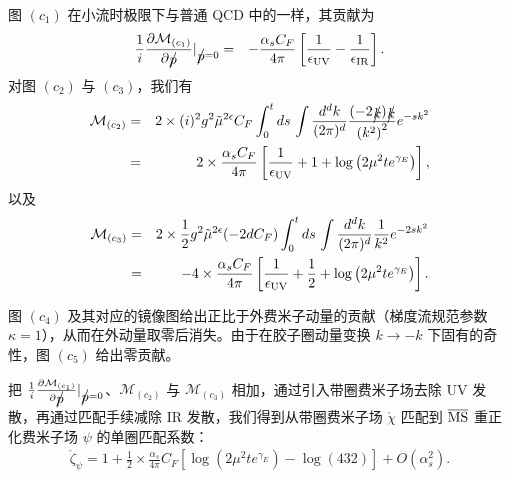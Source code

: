 图 $(c_1)$ 在小流时极限下与普通 QCD 中的一样，其贡献为
\begin{eqnarray}
\label{eq:c1}
\frac{1}{i}\frac{\partial\mathcal{M}_{(c_1)}}{\partial \slashed{p}}|_{\slashed{p}=0}&=& -\frac{\alpha_sC_F}{4\pi}\left[\frac{1}{\epsilon_{\rm UV}}-\frac{1}{\epsilon_{\rm IR}}\right].
\end{eqnarray}
对图 $(c_2)$ 与 $(c_3)$，我们有
\begin{eqnarray}
\label{eq:c2}
\mathcal{M}_{(c_2)}&=& 2\times (i)^2g^2\tilde{\mu}^{2\epsilon}C_F\int_0^tds\, \int\frac{d^dk}{(2\pi)^d}\frac{(-2\slashed{k})\slashed{k}}{\left(k^2 \right)^2}e^{-sk^2}\nonumber\\
&=&2\times\frac{\alpha_sC_F}{4\pi}\left[\frac{1}{\epsilon_{\rm UV}}+1+\log\left(2\mu^2 te^{\gamma_E}\right)\right],
\end{eqnarray}
以及
\begin{eqnarray}
\label{eq:c3}
\mathcal{M}_{(c_3)}&=&2\times \frac{1}{2}g^2\tilde{\mu}^{2\epsilon}(-2dC_F)\int_0^tds\, \int\frac{d^dk}{(2\pi)^d}\frac{1}{k^2}e^{-2sk^2}\nonumber\\
&=&-4\times\frac{\alpha_sC_F}{4\pi}\left[\frac{1}{\epsilon_{\rm UV}}+\frac{1}{2}+\log\left(2\mu^2 te^{\gamma_E}\right)\right].
\end{eqnarray}

图 $(c_4)$ 及其对应的镜像图给出正比于外费米子动量的贡献（梯度流规范参数 $\kappa=1$），从而在外动量取零后消失。由于在胶子圈动量变换 $k\rightarrow -k$ 下固有的奇性，图 $(c_5)$ 给出零贡献。

把 $\frac{1}{i}\frac{\partial\mathcal{M}_{(c_1)}}{\partial \slashed{p}}|_{\slashed{p}=0}$、$\mathcal{M}_{(c_2)}$ 与 $\mathcal{M}_{(c_3)}$ 相加，通过引入带圈费米子场去除 UV 发散，再通过匹配手续减除 IR 发散，我们得到从带圈费米子场 $\mathring{\chi}$ 匹配到 $\overline{\rm MS}$ 重正化费米子场 $\psi$ 的单圈匹配系数：
\begin{eqnarray}
\label{eq:quarkselfresult}
\mathring{\zeta}_{\psi}= 1 +  \frac{1}{2} \times\frac{\alpha_s}{4\pi}C_F\left[\log\left(2\mu^2 te^{\gamma_E}\right)-\log(432)\right] + O(\alpha_s^2).
\end{eqnarray}
